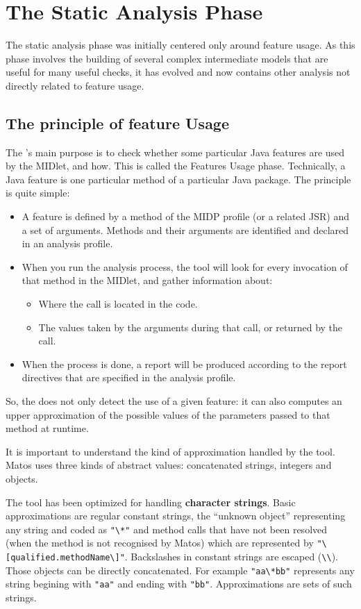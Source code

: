 \section{The Static Analysis Phase} 
The static analysis phase was initially centered only around feature usage.  As
this phase involves the building of several complex intermediate models that 
are useful for many useful checks,  it has evolved and now contains other 
analysis not directly related to feature usage.

\subsection{The principle of feature Usage}
The \ma's main purpose is to check whether some particular Java features
are used by the MIDlet, and how. This is called the Features Usage
phase. Technically, a Java feature is one particular method of a
particular Java package. The principle is quite simple:

\begin{itemize}
\item A feature is defined by a method of the MIDP profile (or a related
JSR) and a set of arguments. Methods and their arguments  are
identified and declared in an analysis profile.
\item When you run the analysis process, the tool will look for every
  invocation of that method in the MIDlet, and gather information
  about:
\begin{itemize}
\item Where the call is located in the code.
\item The values taken by the arguments during that call, or returned
  by the call. 
\end{itemize}
\item When the process is done, a report will be produced according to
  the report directives that are specified in the analysis profile. 
\end{itemize}

So, the \ma does not only detect the use of a given feature: it can also
computes an upper approximation of the possible values of the parameters passed
to that method at runtime. 

It is important to understand the kind of approximation
handled by the tool. Matos uses three kinds of abstract values: concatenated 
strings, integers and objects.

The tool has been optimized for handling \textbf{character strings}. Basic
approximations are regular constant strings, the ``unknown object'' 
representing any string and coded as \verb!"\*"! and method calls that  have not
been resolved (when the method is not recognised by Matos) which are represented by
\verb!"\[qualified.methodName\]"!. Backslashes in constant strings are escaped
(\verb!\\!). Those objects can be directly concatenated. For example
\verb!"aa\*bb"! represents any string begining with \verb!"aa"! and ending with
\verb!"bb"!. Approximations are sets of such strings.

